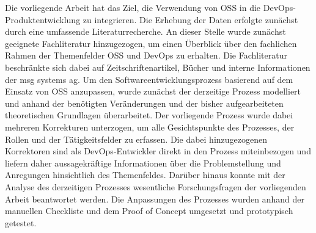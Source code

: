 Die vorliegende Arbeit hat das Ziel, die Verwendung von OSS in die DevOps-Produktentwicklung zu integrieren. Die Erhebung der Daten erfolgte zunächst durch eine umfassende Literaturrecherche. An dieser Stelle wurde zunächst geeignete Fachliteratur hinzugezogen, um einen Überblick über den fachlichen Rahmen der Themenfelder OSS und DevOps zu erhalten. Die Fachliteratur beschränkte sich dabei auf Zeitschriftenartikel, Bücher und interne Informationen der msg systems ag. Um den Softwareentwicklungsprozess basierend auf dem Einsatz von OSS anzupassen, wurde zunächst der derzeitige Prozess modelliert und anhand der benötigten Veränderungen und der bisher aufgearbeiteten theoretischen Grundlagen überarbeitet. Der vorliegende Prozess wurde dabei mehreren Korrekturen unterzogen, um alle Gesichtspunkte des Prozesses, der Rollen und der Tätigkeitsfelder zu erfassen. Die dabei hinzugezogenen Korrektoren sind als DevOps-Entwickler direkt in den Prozess miteinbezogen und liefern daher aussagekräftige Informationen über die Problemstellung und Anregungen hinsichtlich des Themenfeldes. Darüber hinaus konnte mit der Analyse des derzeitigen Prozesses wesentliche Forschungsfragen der vorliegenden Arbeit beantwortet werden. Die Anpassungen des Prozesses wurden anhand der manuellen Checkliste und dem Proof of Concept umgesetzt und prototypisch getestet. 
